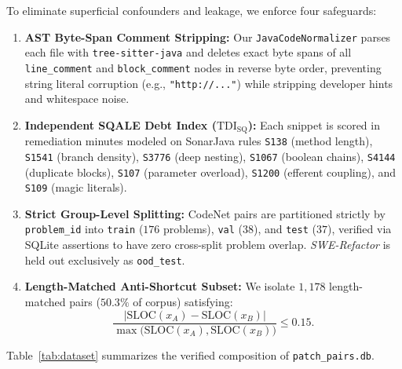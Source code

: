 \documentclass[conference]{IEEEtran}
\begin{document}
To eliminate superficial confounders and leakage, we enforce four safeguards:
\begin{enumerate}
    \item \textbf{AST Byte-Span Comment Stripping:} Our \texttt{JavaCodeNormalizer} parses each file with \texttt{tree-sitter-java} and deletes exact byte spans of all \texttt{line\_comment} and \texttt{block\_comment} nodes in reverse byte order, preventing string literal corruption (e.g., \texttt{"http://..."}) while stripping developer hints and whitespace noise.
    \item \textbf{Independent SQALE Debt Index ($\text{TDI}_{\text{SQ}}$):} Each snippet is scored in remediation minutes modeled on SonarJava rules \texttt{S138} (method length), \texttt{S1541} (branch density), \texttt{S3776} (deep nesting), \texttt{S1067} (boolean chains), \texttt{S4144} (duplicate blocks), \texttt{S107} (parameter overload), \texttt{S1200} (efferent coupling), and \texttt{S109} (magic literals).
    \item \textbf{Strict Group-Level Splitting:} CodeNet pairs are partitioned strictly by \texttt{problem\_id} into \texttt{train} ($176$ problems), \texttt{val} ($38$), and \texttt{test} ($37$), verified via SQLite assertions to have zero cross-split problem overlap. \textit{SWE-Refactor} is held out exclusively as \texttt{ood\_test}.
    \item \textbf{Length-Matched Anti-Shortcut Subset:} We isolate $1{,}178$ length-matched pairs ($50.3\%$ of corpus) satisfying:
    \begin{equation}
        \frac{|\text{SLOC}(x_A) - \text{SLOC}(x_B)|}{\max\big(\text{SLOC}(x_A), \text{SLOC}(x_B)\big)} \le 0.15.
        \label{eq:len_match}
    \end{equation}
\end{enumerate}

Table~\ref{tab:dataset} summarizes the verified composition of \texttt{patch\_pairs.db}.
\end{document}
